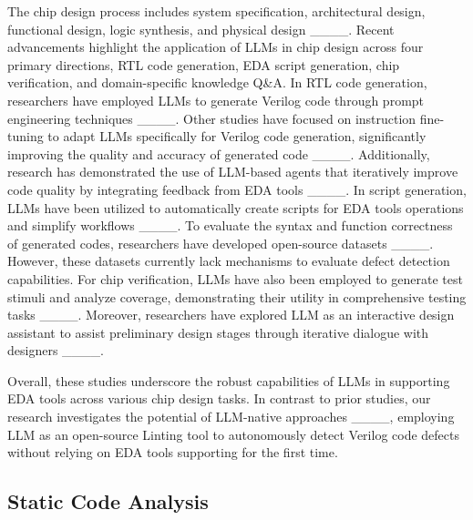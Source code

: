 The chip design process includes system specification, architectural design, functional design, logic synthesis, and physical design ____. Recent advancements highlight the application of LLMs in chip design across four primary directions, RTL code generation, EDA script generation, chip verification, and domain-specific knowledge Q\&A. In RTL code generation, researchers have employed LLMs to generate Verilog code through prompt engineering techniques ____. Other studies have focused on instruction fine-tuning to adapt LLMs specifically for Verilog code generation, significantly improving the quality and accuracy of generated code ____. Additionally, research has demonstrated the use of LLM-based agents that iteratively improve code quality by integrating feedback from EDA tools ____. In script generation, LLMs have been utilized to automatically create scripts for EDA tools operations and simplify workflows ____. To evaluate the syntax and function correctness of generated codes, researchers have developed open-source datasets ____. However, these datasets currently lack mechanisms to evaluate defect detection capabilities. For chip verification, LLMs have also been employed to generate test stimuli and analyze coverage, demonstrating their utility in comprehensive testing tasks ____. Moreover, researchers have explored LLM as an interactive design assistant to assist preliminary design stages through iterative dialogue with designers ____. 

Overall, these studies underscore the robust capabilities of LLMs in supporting EDA tools across various chip design tasks. In contrast to prior studies, our research investigates the potential of LLM-native approaches ____, employing LLM as an open-source Linting tool to autonomously detect Verilog code defects without relying on EDA tools supporting for the first time.


\subsection{Static Code Analysis}



